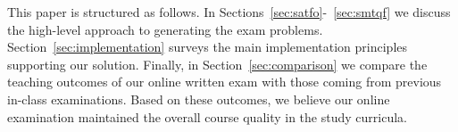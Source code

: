 This paper is structured as follows. In Sections~\ref{sec:satfo}-~\ref{sec:smtqf}
we discuss the high-level approach to generating the exam
problems. Section~\ref{sec:implementation} surveys the main implementation principles supporting our
solution.
Finally, in Section~\ref{sec:comparison} we compare
the teaching outcomes of our online written exam with those coming
from previous in-class examinations. Based on these outcomes,
we believe our online examination maintained the overall course
quality in the study curricula. 
